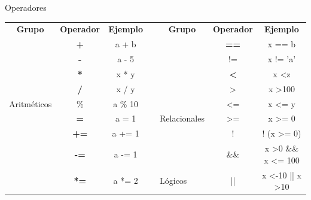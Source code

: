 \documentclass[12pt]{beamer}
\begin{document}
\begin{frame}{Operadores}
    \begin{table}[]
        \centering
        \tiny
        \def\arraystretch{2}
        \begin{tabular}{lccl|l|c|c|}
            \cline{1-3} \cline{5-7}
            \multicolumn{1}{|c|}{\cellcolor[HTML]{E0E0E0}\textbf{Grupo}} & \multicolumn{1}{c|}{\cellcolor[HTML]{E0E0E0}\textbf{Operador}} & \multicolumn{1}{c|}{\cellcolor[HTML]{E0E0E0}\textbf{Ejemplo}} &  & \multicolumn{1}{c|}{\cellcolor[HTML]{E0E0E0}\textbf{Grupo}} & \cellcolor[HTML]{E0E0E0}\textbf{Operador} & \cellcolor[HTML]{E0E0E0}\textbf{Ejemplo} \\ \cline{1-3} \cline{5-7} 
            \multicolumn{1}{|l|}{} & \multicolumn{1}{c|}{\textbf{+}} & \multicolumn{1}{c|}{a + b} &  &  & \textbf{==} & x ==  b \\ \cline{2-3} \cline{6-7} 
            \multicolumn{1}{|l|}{} & \multicolumn{1}{c|}{\textbf{-}} & \multicolumn{1}{c|}{a - 5} &  &  & != & x != 'a' \\ \cline{2-3} \cline{6-7} 
            \multicolumn{1}{|l|}{} & \multicolumn{1}{c|}{\textbf{*}} & \multicolumn{1}{c|}{x * y} &  &  & \textbf{\textless{}} & x \textless z \\ \cline{2-3} \cline{6-7} 
            \multicolumn{1}{|l|}{} & \multicolumn{1}{c|}{\textbf{/}} & \multicolumn{1}{c|}{x / y} &  &  & \textgreater{} & x \textgreater 100 \\ \cline{2-3} \cline{6-7} 
            \multicolumn{1}{|l|}{\multirow{-5}{*}{Aritméticos}} & \multicolumn{1}{c|}{\%} & \multicolumn{1}{c|}{a \% 10} &  &  & \textless{}= & x \textless{}= y \\ \cline{1-3} \cline{6-7} 
            \multicolumn{1}{|l|}{} & \multicolumn{1}{c|}{\textbf{=}} & \multicolumn{1}{c|}{a = 1} &  & \multirow{-6}{*}{Relacionales} & \textgreater{}= & x \textgreater{}= 0 \\ \cline{2-3} \cline{5-7} 
            \multicolumn{1}{|l|}{} & \multicolumn{1}{c|}{\textbf{+=}} & \multicolumn{1}{c|}{a += 1} &  &  & ! & ! (x \textgreater{}= 0) \\ \cline{2-3} \cline{6-7} 
            \multicolumn{1}{|l|}{} & \multicolumn{1}{c|}{\textbf{-=}} & \multicolumn{1}{c|}{a -= 1} &  &  & \&\& & x \textgreater 0 \&\& x \textless{}= 100 \\ \cline{2-3} \cline{6-7} 
            \multicolumn{1}{|l|}{} & \multicolumn{1}{c|}{\textbf{*=}} & \multicolumn{1}{c|}{a *= 2} &  & \multirow{-3}{*}{Lógicos} & || & x \textless -10 || x \textgreater 10 \\ \cline{2-3} \cline{5-7} 

\end{tabular}
\end{table}
\end{frame}
\end{document}
